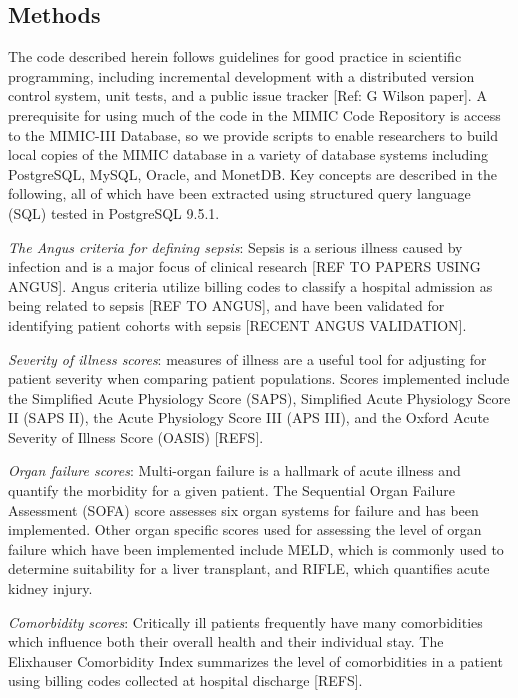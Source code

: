 \documentclass{bioinfo}
\begin{document}
\begin{methods}
\section{Methods}

The code described herein follows guidelines for good practice in scientific programming, including incremental development with a distributed version control system, unit tests, and a public issue tracker [Ref: G Wilson paper].
A prerequisite for using much of the code in the MIMIC Code Repository is access to the MIMIC-III Database, so we provide scripts to enable researchers to build local copies of the MIMIC database in a variety of database systems including PostgreSQL, MySQL, Oracle, and MonetDB.
Key concepts are described in the following, all of which have been extracted using structured query language (SQL) tested in PostgreSQL 9.5.1. %

\emph{The Angus criteria for defining sepsis}: Sepsis is a serious illness caused by infection and is a major focus of clinical research [REF TO PAPERS USING ANGUS]. Angus criteria utilize billing codes to classify a hospital admission as being related to sepsis [REF TO ANGUS], and have been validated for identifying patient cohorts with sepsis [RECENT ANGUS VALIDATION].

\emph{Severity of illness scores}: measures of illness are a useful tool for adjusting for patient severity when comparing patient populations. Scores implemented include the Simplified Acute Physiology Score (SAPS), Simplified Acute Physiology Score II (SAPS II), the Acute Physiology Score III (APS III), and the Oxford Acute Severity of Illness Score (OASIS) [REFS].

\emph{Organ failure scores}: Multi-organ failure is a hallmark of acute illness and quantify the morbidity for a given patient. The Sequential Organ Failure Assessment (SOFA) score assesses six organ systems for failure and has been implemented. Other organ specific scores used for assessing the level of organ failure which have been implemented include MELD, which is commonly used to determine suitability for a liver transplant, and RIFLE, which quantifies acute kidney injury.

\emph{Comorbidity scores}: Critically ill patients frequently have many comorbidities which influence both their overall health and their individual stay. The Elixhauser Comorbidity Index summarizes the level of comorbidities in a patient using billing codes collected at hospital discharge [REFS].


\end{methods}
\end{document}
